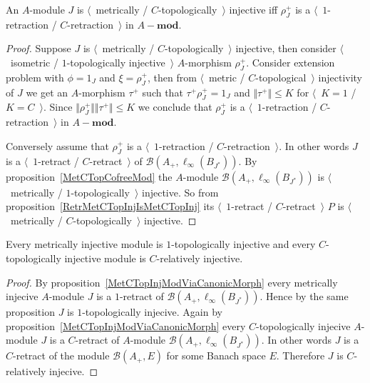 \begin{proposition}\label{MetCTopInjModViaCanonicMorph} An $A$-module $J$ is
$\langle$~metrically / $C$-topologically~$\rangle$ injective iff $\rho_J^+$ is 
a $\langle$~$1$-retraction / $C$-retraction~$\rangle$ in $A-\mathbf{mod}$.
\end{proposition}
\begin{proof}
Suppose $J$ is 
$\langle$~metrically / $C$-topologically~$\rangle$ injective, then consider 
$\langle$~isometric / $1$-topologically injective~$\rangle$
$A$-morphism $\rho_J^+$. Consider extension problem with $\phi=1_J$ 
and $\xi=\rho_J^+$, then from $\langle$~metric / $C$-topological~$\rangle$ 
injectivity of $J$ we get an $A$-morphism $\tau^+$ such 
that $\tau^+\rho_J^+=1_J$
and $\Vert\tau^+\Vert\leq K$ for $\langle$~$K=1$ / $K=C$~$\rangle$. 
Since $\Vert\rho_J^+\Vert\Vert \tau^+\Vert\leq K$ 
we conclude that $\rho_J^+$ is 
a $\langle$~$1$-retraction / $C$-retraction~$\rangle$ in $A-\mathbf{mod}$.

Conversely assume that $\rho_J^+$ is 
a $\langle$~$1$-retraction / $C$-retraction~$\rangle$. In other words $J$ is 
a $\langle$~$1$-retract / $C$-retract~$\rangle$ of 
$\mathcal{B}(A_+, \ell_\infty(B_{J^*}))$. By proposition~\ref{MetCTopCofreeMod} 
the $A$-module $\mathcal{B}(A_+, \ell_\infty(B_{J^*}))$ 
is $\langle$~metrically / $1$-topologically~$\rangle$ injective. So from 
proposition~\ref{RetrMetCTopInjIsMetCTopInj} 
its $\langle$~$1$-retract / $C$-retract~$\rangle$ $P$ is 
$\langle$~metrically / $C$-topologically~$\rangle$ injective.
\end{proof}

\begin{proposition}\label{MetInjIsTopInjAndTopInjIsRelInj} Every metrically
injective module is $1$-topologically injective and every $C$-topologically 
injective module is $C$-relatively injective.
\end{proposition}
\begin{proof} By proposition~\ref{MetCTopInjModViaCanonicMorph} every 
metrically injecive $A$-module $J$ is a $1$-retract 
of $\mathcal{B}(A_+, \ell_\infty(B_{J^*}))$. Hence by the same proposition $J$ 
is $1$-topologically injecive. Again by 
proposition~\ref{MetCTopInjModViaCanonicMorph} every $C$-topologically 
injecive $A$-module $J$ is a $C$-retract 
of $A$-module $\mathcal{B}(A_+, \ell_\infty(B_{J^*}))$. 
In other words $J$ is a $C$-retract of the module $\mathcal{B}(A_+, E)$ for 
some Banach space $E$. Therefore $J$ is $C$-relatively injecive.
\end{proof}

